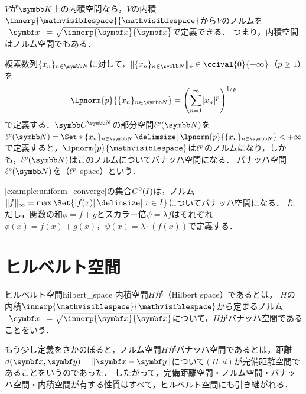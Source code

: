 \documentclass[../../main]{subfiles}
\begin{document}
\begin{example}
  \(V\)が\(\numset{K}\)上の内積空間なら，\(V\)の内積\(\innerp{\holder}{\holder}\)から\(V\)のノルムを\(\vnorm{\vect{x}}=\sqrt{\innerp{\vect{x}}{\vect{x}}}\)で定義できる．
  つまり，内積空間はノルム空間でもある．
\end{example}

\begin{example}[\(\lebesgue{p}\)空間]
  複素数列\(\seq{x_n}_{n\in\numset{N}}\)に対して，\(\vnorm{\seq{x_n}_{n\in\numset{N}}}_p\in\ccival{0}{+\infty}\)（\(p\geq 1\)）を
  \[
    \lpnorm{p}{\seq{x_n}_{n\in\numset{N}}} = \pqty*{\sum_{n=1}^\infty\abs{x_n}^p}^{1/p}
  \]
  で定義する．\(\numset{C}^{\numset{N}}\)の部分空間\(\lebesgue{p}(\numset{N})\)を\(\lebesgue{p}(\numset{N})=\Set*{\seq{x_n}_{n\in\numset{N}}\given\lpnorm{p}{\seq{x_n}_{n\in\numset{N}}}<+\infty}\)
  で定義すると，\(\lpnorm{p}{\holder}\)は\(\lebesgue{p}\)のノルムになり，しかも，\(\lebesgue{p}(\numset{N})\)はこのノルムについてバナッハ空間になる．
  バナッハ空間\(\lebesgue{p}(\numset{N})\)を（\(\lebesgue{p}\) space）という．
\end{example}

\begin{example}
  \cref{example:uniform_converge}の集合\(C^0(I)\)は，ノルム\(\vnorm{f}_\infty=\max\Set{\abs{f(x)}\given x\in I}\)についてバナッハ空間になる．
  ただし，関数の和\(\phi=f+g\)とスカラー倍\(\psi=\lambda f\)はそれぞれ\(\phi(x)=f(x)+g(x)\)，\(\psi(x)=\lambda\cdot(f(x))\)で定義する．
\end{example}

\section{ヒルベルト空間}

\begin{definition}{ヒルベルト空間}{hilbert_space}
  内積空間\(H\)が（Hilbert space）であるとは，
  \(H\)の内積\(\innerp{\holder}{\holder}\)から定まるノルム\(\vnorm{\vect{x}}=\sqrt{\innerp{\vect{x}}{\vect{x}}}\)について，\(H\)がバナッハ空間であることをいう．
\end{definition}

もう少し定義をさかのぼると，ノルム空間\(H\)がバナッハ空間であるとは，距離\(d(\vect{x},\vect{y})=\vnorm{\vect{x}-\vect{y}}\)について\((H,d)\)が完備距離空間であることをいうのであった．
したがって，完備距離空間・ノルム空間・バナッハ空間・内積空間が有する性質はすべて，ヒルベルト空間にも引き継がれる．
\end{document}
